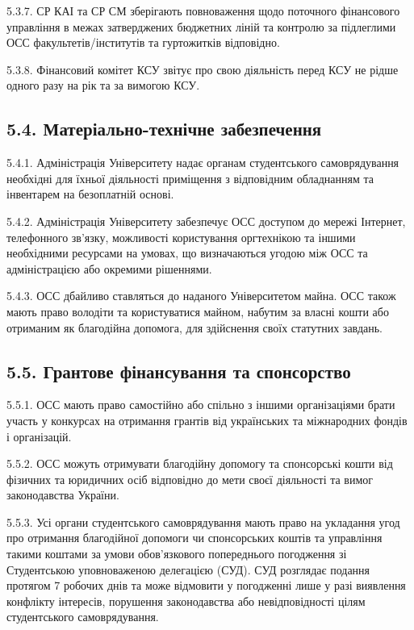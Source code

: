     5.3.7. СР КАІ та СР СМ зберігають повноваження щодо поточного фінансового управління в межах затверджених бюджетних ліній та контролю за підлеглими ОСС факультетів/інститутів та гуртожитків відповідно.

    5.3.8. Фінансовий комітет КСУ звітує про свою діяльність перед КСУ не рідше одного разу на рік та за вимогою КСУ.

\subsection*{5.4. Матеріально-технічне забезпечення}
    5.4.1. Адміністрація Університету надає органам студентського самоврядування необхідні для їхньої діяльності приміщення з відповідним обладнанням та інвентарем на безоплатній основі.

    5.4.2. Адміністрація Університету забезпечує ОСС доступом до мережі Інтернет, телефонного зв'язку, можливості користування оргтехнікою та іншими необхідними ресурсами на умовах, що визначаються угодою між ОСС та адміністрацією або окремими рішеннями.

    5.4.3. ОСС дбайливо ставляться до наданого Університетом майна. ОСС також мають право володіти та користуватися майном, набутим за власні кошти або отриманим як благодійна допомога, для здійснення своїх статутних завдань.

\subsection*{5.5. Грантове фінансування та спонсорство}
    5.5.1. ОСС мають право самостійно або спільно з іншими організаціями брати участь у конкурсах на отримання грантів від українських та міжнародних фондів і організацій.

    5.5.2. ОСС можуть отримувати благодійну допомогу та спонсорські кошти від фізичних та юридичних осіб відповідно до мети своєї діяльності та вимог законодавства України.

    5.5.3. Усі органи студентського самоврядування мають право на укладання угод про отримання благодійної допомоги чи спонсорських коштів та управління такими коштами за умови обов'язкового попереднього погодження зі Студентською уповноваженою делегацією (СУД). СУД розглядає подання протягом 7 робочих днів та може відмовити у погодженні лише у разі виявлення конфлікту інтересів, порушення законодавства або невідповідності цілям студентського самоврядування.

